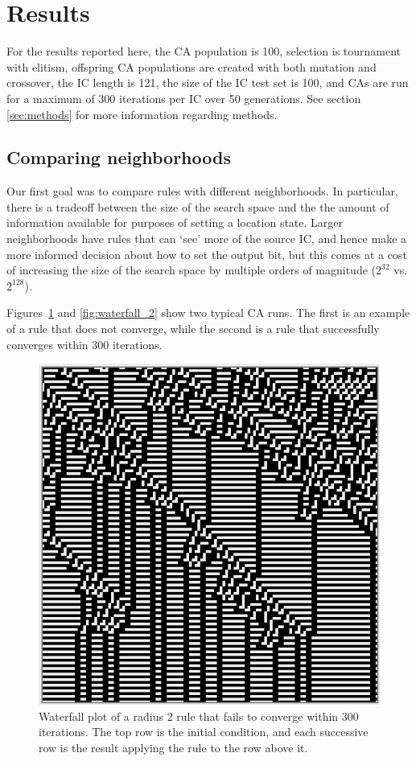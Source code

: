 \section{Results} \label{results}

For the results reported here, the CA population is 100, selection is tournament with elitism, offspring CA populations are created with both 
mutation and crossover, the IC length is 121, the size of the IC test set is 100, and CAs are run for a maximum of 
300 iterations per IC over 50 generations. See section \ref{sec:methods} 
for more information regarding methods.

\subsection{Comparing neighborhoods} \label{sec:2_1}
Our first goal was to compare rules with different neighborhoods. In particular, there is a tradeoff between the size of the search space and the 
the amount of information available for purposes of setting a location state. Larger neighborhoods have rules that can `see' more of the source IC, and 
hence make a more informed decision about how to set the output bit, but this comes at a cost of increasing the size of the search space by multiple 
orders of magnitude ($2^{32}$ vs. $2^{128}$).

Figures~\ref{fig:waterfall_1} and \ref{fig:waterfall_2} show two typical CA runs. The first is an example of a rule that does not converge, while the second 
is a rule that successfully converges within 300 iterations.

\begin{figure}
\begin{center}
\includegraphics[width=0.8\linewidth]{figures/non_converging_radius2.png}
\caption{Waterfall plot of a radius 2 rule that fails to converge within 300 iterations. The top row is the initial condition, and each successive row is the 
result applying the rule to the row above it.}
\label{fig:waterfall_1}
\end{center}
\end{figure}

